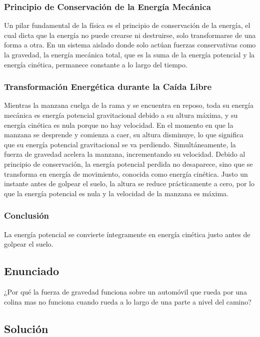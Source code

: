 \documentclass[12pt,a4paper]{article}
\begin{document}
\subsubsection*{Principio de Conservación de la Energía Mecánica}
Un pilar fundamental de la física es el principio de conservación de la energía, el cual dicta que la energía no puede crearse ni destruirse, solo transformarse de una forma a otra. En un sistema aislado donde solo actúan fuerzas conservativas como la gravedad, la energía mecánica total, que es la suma de la energía potencial y la energía cinética, permanece constante a lo largo del tiempo.

\subsubsection*{Transformación Energética durante la Caída Libre}
Mientras la manzana cuelga de la rama y se encuentra en reposo, toda su energía mecánica es energía potencial gravitacional debido a su altura máxima, y su energía cinética es nula porque no hay velocidad. En el momento en que la manzana se desprende y comienza a caer, su altura disminuye, lo que significa que su energía potencial gravitacional se va perdiendo. Simultáneamente, la fuerza de gravedad acelera la manzana, incrementando su velocidad. Debido al principio de conservación, la energía potencial perdida no desaparece, sino que se transforma en energía de movimiento, conocida como energía cinética. Justo un instante antes de golpear el suelo, la altura se reduce prácticamente a cero, por lo que la energía potencial es nula y la velocidad de la manzana es máxima.

\subsubsection*{Conclusión}
La energía potencial se convierte íntegramente en energía cinética justo antes de golpear el suelo.

\newpage
\subsection*{Enunciado}
¿Por qué la fuerza de gravedad funciona sobre un automóvil que rueda por una colina mas no funciona cuando rueda a lo largo de una parte a nivel del camino?

\subsection*{Solución}
\end{document}
